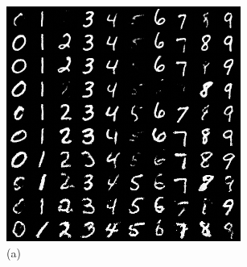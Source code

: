 \begin{figure}[H]
\begin{minipage}[left]{.45\textwidth}
    \centering
    \includegraphics[width=.95\textwidth]{figures/MNIST/dif_temps.png}
    \\ (a)
\end{minipage}
\begin{minipage}{.1\textwidth}


\end{minipage}
\end{figure}
